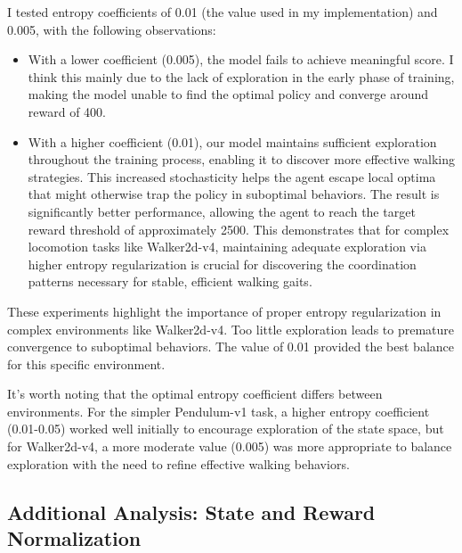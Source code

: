 \documentclass[a4paper,twocolumn]{article}
\begin{document}
I tested entropy coefficients of 0.01 (the value used in my implementation) and 0.005, with the following observations:
\begin{itemize}
	\item With a lower coefficient (0.005), the model fails to achieve meaningful score. I think this mainly due to the lack of exploration in the early phase of training, making the model unable to find the optimal policy and converge around reward of 400.
	\item With a higher coefficient (0.01), our model maintains sufficient exploration throughout the training process, enabling it to discover more effective walking strategies. This increased stochasticity helps the agent escape local optima that might otherwise trap the policy in suboptimal behaviors. The result is significantly better performance, allowing the agent to reach the target reward threshold of approximately 2500. This demonstrates that for complex locomotion tasks like Walker2d-v4, maintaining adequate exploration via higher entropy regularization is crucial for discovering the coordination patterns necessary for stable, efficient walking gaits.
\end{itemize}

These experiments highlight the importance of proper entropy regularization in complex environments like Walker2d-v4. Too little exploration leads to premature convergence to suboptimal behaviors. The value of 0.01 provided the best balance for this specific environment.

It's worth noting that the optimal entropy coefficient differs between environments. For the simpler Pendulum-v1 task, a higher entropy coefficient (0.01-0.05) worked well initially to encourage exploration of the state space, but for Walker2d-v4, a more moderate value (0.005) was more appropriate to balance exploration with the need to refine effective walking behaviors.

\subsection{Additional Analysis: State and Reward Normalization}

\end{document}
